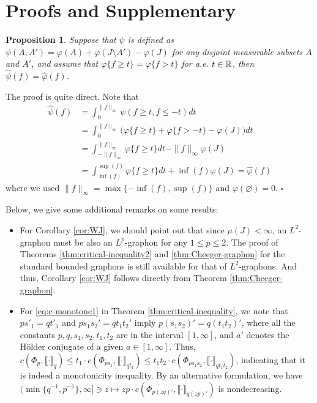 \documentclass[12pt,a4paper]{article}
\newtheorem{prop}[theorem]{Proposition}
\newenvironment{proof}{\medskip\noindent{\bf Proof. }}{\hfill$\square$\medskip}
\begin{document}
\section{Proofs and Supplementary}\label{sec:proof}

\begin{prop}\label{pro:setpair-generalize-original}
Suppose that $\psi$ is defined as  $\psi(A,A')=\varphi(A)+\varphi(J\setminus A')-\varphi(J)$ for any disjoint measurable subsets $A$ and $A'$, and assume that $\varphi\{f\ge t\}=\varphi\{f> t\}$ for a.e. $t\in\mathbb{R}$, then $\widehat{\psi}(f)=\widehat{\varphi}(f)$. 
\end{prop}

\begin{proof}
The proof is quite direct. Note that
\begin{align*}
\widehat{\psi}(f)&=\int_0^{\|f\|_\infty} \psi(f\ge t,f\le-t)dt 
\\&=\int_0^{\|f\|_\infty}\big(\varphi\{f\ge t\}+\varphi\{f>- t\}-\varphi(J)\big)dt\\
&=\int_{-\|f\|_\infty}^{\|f\|_\infty}\varphi\{f\ge t\}dt- \|f\|_\infty \varphi(J)
\\&=\int_{\inf(f)}^{\sup(f)}\varphi\{f\ge t\}dt +\inf(f)\varphi(J)=\widehat{\varphi}(f) %
\end{align*}
where we used $\|f\|_\infty=\max\{-\inf(f),\sup(f)\}$ and $\varphi(\varnothing)=0$.    
\end{proof}

Below, we give some additional remarks on some results: %
\begin{itemize}
\item 
For Corollary \ref{cor:WJ}, we should point out that since $\mu(J)<\infty$, an $L^2$-graphon must be also an $L^p$-graphon for any $1\le p\le 2$. 
The proof of Theorems \ref{thm:critical-inequality2} and \ref{thm:Cheeger-graphon} for the standard bounded graphons is still available for that of $L^2$-graphons. And thus, Corollary \ref{cor:WJ} follows directly from Theorem \ref{thm:Cheeger-graphon}. %
\item 
For \eqref{eq:c-monotone1} in Theorem \ref{thm:critical-inequality}, we note that $ps'_1=qt'_1$ and $ps_1s_2'=qt_1t_2'$ imply $p(s_1s_2)'=q(t_1t_2)'$, where all the constants $p,q,s_1,s_2,t_1,t_2$ are in the interval $[1,\infty]$, and $a'$ denotes the H\"older conjugate of a given  $a\in[1,\infty]$. Thus, $c(\Phi_p,\llbracket \cdot\rrbracket_{q})\le t_1\cdot  c(\Phi_{ps_1},\llbracket \cdot\rrbracket_{qt_1})\le t_1t_2\cdot  c(\Phi_{ps_1s_2},\llbracket \cdot\rrbracket_{qt_1t_2})$, indicating that it is indeed a monotonicity inequality. 
By an alternative formulation, we have $(\min\{q^{-1},p^{-1}\},\infty]\ni z\mapsto zp\cdot c(\Phi_{p(zq)'},\llbracket \cdot\rrbracket_{q(zp)'})$ is nondecreasing.
\end{itemize}
\end{document}
